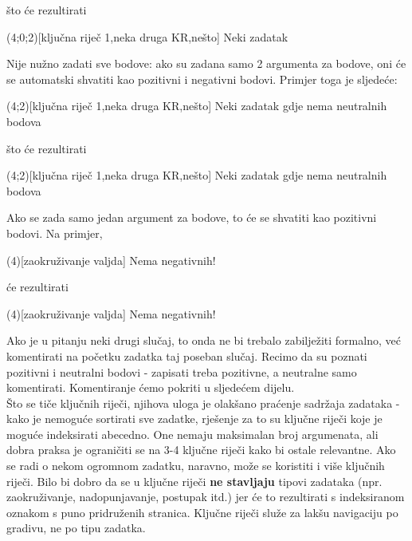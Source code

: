 \documentclass{studosi-workbook}
\begin{document}
    što će rezultirati

    \begin{zadatak}(4;0;2)[ključna riječ 1,neka druga KR,nešto]
        Neki zadatak
    \end{zadatak}
    \vspace*{20pt}

    Nije nužno zadati sve bodove: ako su zadana samo 2 argumenta za bodove, oni će se
    automatski shvatiti kao pozitivni i negativni bodovi. Primjer toga je sljedeće:
    
    \begin{kod}
   	\begin{zadatak}(4;2)[ključna riječ 1,neka druga KR,nešto]
   		Neki zadatak gdje nema neutralnih bodova
   	\end{zadatak}
    \end{kod}
    
    što će rezultirati
    
    \begin{zadatak}(4;2)[ključna riječ 1,neka druga KR,nešto]
    	Neki zadatak gdje nema neutralnih bodova
    \end{zadatak}
	\vspace*{20pt}
    
    Ako se zada samo jedan argument za bodove, to će se shvatiti kao pozitivni bodovi. Na primjer,
    
    \begin{kod}
   	\begin{zadatak}(4)[zaokruživanje valjda]
   		Nema negativnih!
   	\end{zadatak}
    \end{kod}
    
    će rezultirati
    
    \begin{zadatak}(4)[zaokruživanje valjda]
    	Nema negativnih!
    \end{zadatak}
	\vspace*{20pt}
    
    
    Ako je u pitanju neki drugi slučaj, to onda ne bi trebalo zabilježiti formalno, već
    komentirati na početku zadatka taj poseban slučaj. Recimo da su poznati pozitivni i neutralni bodovi - zapisati treba pozitivne, a neutralne samo komentirati. Komentiranje ćemo pokriti u sljedećem dijelu. \\

    Što se tiče ključnih riječi, njihova uloga je olakšano praćenje sadržaja zadataka -
    kako je nemoguće sortirati sve zadatke, rješenje za to su ključne riječi koje je
    moguće indeksirati abecedno. One nemaju maksimalan broj argumenata, ali dobra
    praksa je ograničiti se na 3-4 ključne riječi kako bi ostale relevantne. Ako se
    radi o nekom ogromnom zadatku, naravno, može se koristiti i više ključnih riječi. Bilo bi dobro da se u ključne riječi \textbf{ne stavljaju} tipovi zadataka (npr. zaokruživanje, nadopunjavanje, postupak itd.) jer će to rezultirati s indeksiranom oznakom s puno pridruženih stranica. Ključne riječi služe za lakšu navigaciju po gradivu, ne po tipu zadatka. \\
    
\end{document}
